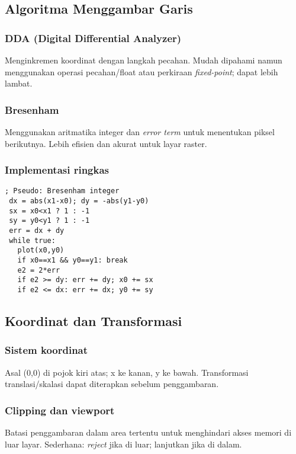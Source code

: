 \documentclass[../main.tex]{subfiles}
\begin{document}
\subsection{Algoritma Menggambar Garis}
\subsubsection{DDA (Digital Differential Analyzer)}
Menginkremen koordinat dengan langkah pecahan. Mudah dipahami namun menggunakan operasi pecahan/float atau perkiraan \textit{fixed-point}; dapat lebih lambat.

\subsubsection{Bresenham}
Menggunakan aritmatika integer dan \textit{error term} untuk menentukan piksel berikutnya. Lebih efisien dan akurat untuk layar raster.

\subsubsection{Implementasi ringkas}
\begin{verbatim}
; Pseudo: Bresenham integer
 dx = abs(x1-x0); dy = -abs(y1-y0)
 sx = x0<x1 ? 1 : -1
 sy = y0<y1 ? 1 : -1
 err = dx + dy
 while true:
   plot(x0,y0)
   if x0==x1 && y0==y1: break
   e2 = 2*err
   if e2 >= dy: err += dy; x0 += sx
   if e2 <= dx: err += dx; y0 += sy
\end{verbatim}

\subsection{Koordinat dan Transformasi}
\subsubsection{Sistem koordinat}
Asal (0,0) di pojok kiri atas; x ke kanan, y ke bawah. Transformasi translasi/skalasi dapat diterapkan sebelum penggambaran.

\subsubsection{Clipping dan viewport}
Batasi penggambaran dalam area tertentu untuk menghindari akses memori di luar layar. Sederhana: \textit{reject} jika di luar; lanjutkan jika di dalam.
\end{document}
